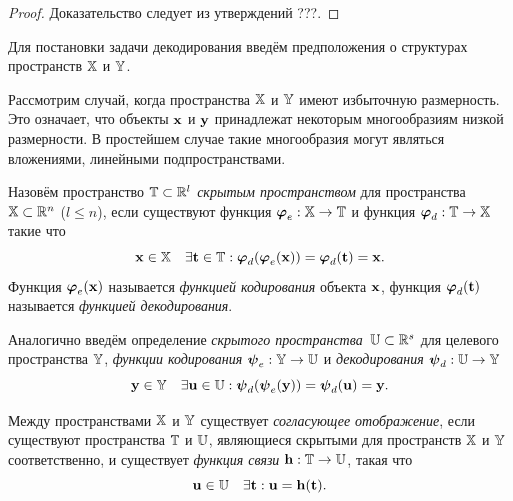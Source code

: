 \begin{proof}
	 Доказательство следует из утверждений ???.
\end{proof}

\hrulefill

Для постановки задачи декодирования введём предположения о структурах пространств $\mathbb{X}$ и $\mathbb{Y}$.
\begin{assumption}
	Рассмотрим случай, когда пространства $\mathbb{X}$ и $\mathbb{Y}$ имеют избыточную размерность. 
	Это означает, что объекты $\mathbf{x}$ и $\mathbf{y}$ принадлежат некоторым многообразиям низкой размерности. В простейшем случае такие многообразия могут являться вложениями, линейными подпространствами.
\end{assumption}

\begin{definition}
	Назовём пространство $\mathbb{T} \subset \mathbb{R}^l$ \textit{скрытым пространством} для пространства $\mathbb{X} \subset \mathbb{R}^n$ ($l \leq n$), если существуют функция $\boldsymbol{\varphi}_e: \mathbb{X} \to \mathbb{T}$ и функция $\boldsymbol{\varphi}_d: \mathbb{T}  \to \mathbb{X}$ такие что
	\[
	\mathbf{x} \in \mathbb{X} \quad \exists \mathbf{t} \in \mathbb{T}: \boldsymbol{\varphi}_d (\boldsymbol{\varphi}_e(\mathbf{x})) = \boldsymbol{\varphi}_d(\mathbf{t}) = \mathbf{x}.
	\]
	Функция $\boldsymbol{\varphi}_e(\mathbf{x})$ называется \textit{функцией кодирования} объекта $\mathbf{x}$, функция $\boldsymbol{\varphi}_d(\mathbf{t})$  называется \textit{функцией декодирования}. 
	
	Аналогично введём определение \textit{скрытого пространства}~$\mathbb{U} \subset \mathbb{R}^s$ для целевого пространства $\mathbb{Y}$, \textit{функции кодирования} $\boldsymbol{\psi}_e: \mathbb{Y} \to \mathbb{U}$ и \textit{декодирования} $\boldsymbol{\psi}_d: \mathbb{U}  \to \mathbb{Y}$
	\[
	 \mathbf{y} \in \mathbb{Y} \quad  \exists \mathbf{u} \in \mathbb{U}: \boldsymbol{\psi}_d (\boldsymbol{\psi}_e(\mathbf{y})) = \boldsymbol{\psi}_d(\mathbf{u}) = \mathbf{y}.
	\]
\end{definition}

\begin{definition}
	Между пространствами $\mathbb{X}$ и $\mathbb{Y}$ существует \textit{согласующее отображение}, если существуют пространства $\mathbb{T}$ и $\mathbb{U}$, являющиеся скрытыми для пространств $\mathbb{X}$ и $\mathbb{Y}$ соответственно, и существует \textit{функция связи} $\mathbf{h}: \mathbb{T} \rightarrow \mathbb{U}$, такая что
	\[
	\mathbf{u} \in \mathbb{U} \quad \exists \mathbf{t}:  \mathbf{u} = \mathbf{h}(\mathbf{t}).
	\]
\end{definition}

